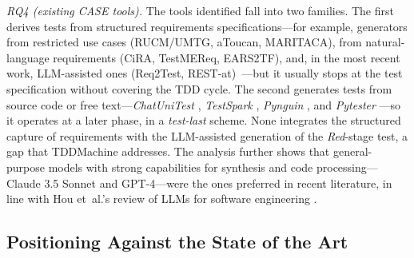 \documentclass[10pt,journal,twoside,letterpaper]{IEEEtran}
\begin{document}
    \textit{RQ4 (existing CASE tools).} The tools identified fall into two families. The first derives tests from structured requirements specifications---for example, generators from restricted use cases (RUCM/UMTG, aToucan, MARITACA), from natural-language requirements (CiRA, TestMEReq, EARS2TF), and, in the most recent work, LLM-assisted ones (Req2Test, REST-at)~\cite{Morales2024Dsl,Khaldi2026Agentic,Orekhov2026Example,Fathima2026Automated,Bhatia2025Automated,Jang2025Automatic,Shimizu2025Automatic,Ishinari2026Data,Arruda2026Deriving,Trinh2026Fstg,Ishinari2025Improving,Louzaoui2016Invalid,Borg2022Quality,LeonQuinstedt2026Rest,Franca2026Req2test,Sinha2015Requirements,Wei2024Requirements,Wen2026Research,Salari2026Test,Varpe2025User,Li2026Test,Trinh2026Tcg,Wu2022Node,Herwanto2025Enhancing,Baker2026Industrial,Dilorenzo2026Recommending}---but it usually stops at the test specification without covering the TDD cycle. The second generates tests from source code or free text---\emph{ChatUniTest} \cite{chen2024chatunitest}, \emph{TestSpark} \cite{sapozhnikov2024testspark}, \emph{Pynguin} \cite{lukasczyk2022pynguin}, and \emph{Pytester} \cite{takerngsaksiri2025pytester}---so it operates at a later phase, in a \emph{test-last} scheme. None integrates the structured capture of requirements with the LLM-assisted generation of the \emph{Red}-stage test, a gap that TDDMachine addresses. The analysis further shows that general-purpose models with strong capabilities for synthesis and code processing---Claude 3.5 Sonnet and GPT-4---were the ones preferred in recent literature, in line with Hou et~al.'s review of LLMs for software engineering \cite{hou2024llm4se}.
    
    \subsection{Positioning Against the State of the Art}
    \label{subsec:posicionamiento}
    
\end{document}
